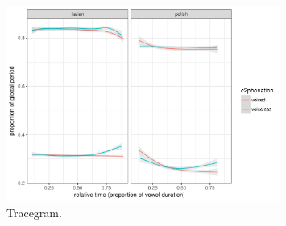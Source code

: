 \documentclass[11pt,A4paper,]{article}
\begin{document}
\begin{figure}[htbp]
\centering
\includegraphics[width=0.80000\textwidth]{../graphics/tracegram.pdf}
\caption{Tracegram.\label{f:tracegram}}
\end{figure}

\renewcommand\refname{References}

\end{document}
